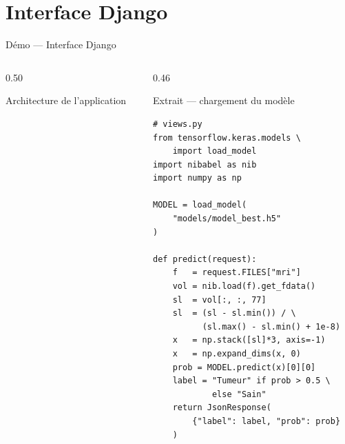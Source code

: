 \documentclass[aspectratio=169, 12pt]{beamer}
\begin{document}
\section{Interface Django}

\begin{frame}{Démo — Interface Django}
  \begin{columns}[T]

    \begin{column}{0.50\textwidth}
      \begin{block}{\faServer\; Architecture de l'application}
      \end{block}
    \end{column}

    \begin{column}{0.46\textwidth}
      \begin{block}{\faCode\; Extrait — chargement du modèle}
        \begin{lstlisting}[style=pyBeamer]
# views.py
from tensorflow.keras.models \
    import load_model
import nibabel as nib
import numpy as np

MODEL = load_model(
    "models/model_best.h5"
)

def predict(request):
    f   = request.FILES["mri"]
    vol = nib.load(f).get_fdata()
    sl  = vol[:, :, 77]
    sl  = (sl - sl.min()) / \
          (sl.max() - sl.min() + 1e-8)
    x   = np.stack([sl]*3, axis=-1)
    x   = np.expand_dims(x, 0)
    prob = MODEL.predict(x)[0][0]
    label = "Tumeur" if prob > 0.5 \
            else "Sain"
    return JsonResponse(
        {"label": label, "prob": prob}
    )
        \end{lstlisting}
      \end{block}


\end{column}
\end{columns}
\end{frame}
\end{document}

